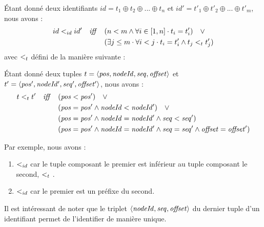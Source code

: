 \begin{definition}
  Étant donné deux identifiants $id = t_1 \oplus t_2 \oplus ... \oplus t_n$ et $id' = t'_1 \oplus t'_2 \oplus ... \oplus t'_m$, nous avons :
  \begin{equation*}
    \begin{split}
      id <_{id} id' \quad \mathit{iff} \quad     & (n < m \land \forall i \in [1,n] \cdot t_i = t'_i) \quad \lor \\
                                            & (\exists j \leq m \cdot \forall i < j \cdot t_i = t'_i \land t_j <_{t} t'_j) \\
    \end{split}
  \end{equation*}
  avec $<_{t}$ défini de la manière suivante :
  \begin{subdefinition}
    Étant donné deux tuples $t = \langle \mathit{pos},\mathit{nodeId},\mathit{seq},\mathit{offset} \rangle$ et $t' = \langle \mathit{pos'},\mathit{nodeId'},\mathit{seq'},\mathit{offset'} \rangle$, nous avons :
    \begin{equation*}
      \begin{split}
        t <_{t} t' \quad \mathit{iff} \quad  & (\mathit{pos} < \mathit{pos}') \quad \lor \\
                                            & (\mathit{pos} = \mathit{pos'} \land \mathit{nodeId} < \mathit{nodeId'}) \quad \lor \\
                                            & (\mathit{pos} = \mathit{pos'} \land \mathit{nodeId} = \mathit{nodeId'} \land \mathit{seq} < \mathit{seq'}) \\
                                            & (\mathit{pos} = \mathit{pos'} \land \mathit{nodeId} = \mathit{nodeId'} \land \mathit{seq} = \mathit{seq'} \land \mathit{offset} = \mathit{offset'}) \\
      \end{split}
    \end{equation*}
  \end{subdefinition}
\end{definition}

Par exemple, nous avons :
\begin{enumerate}
  \item  {} $<_{id}$  car le tuple composant le premier est inférieur au tuple composant le second, \ie {} $<_{t}$ .
  \item {} $<_{id}$  car le premier est un préfixe du second.
\end{enumerate}

Il est intéressant de noter que le triplet $\langle \mathit{nodeId},\mathit{seq},\mathit{offset} \rangle$ du dernier tuple d'un identifiant permet de l'identifier de manière unique.
